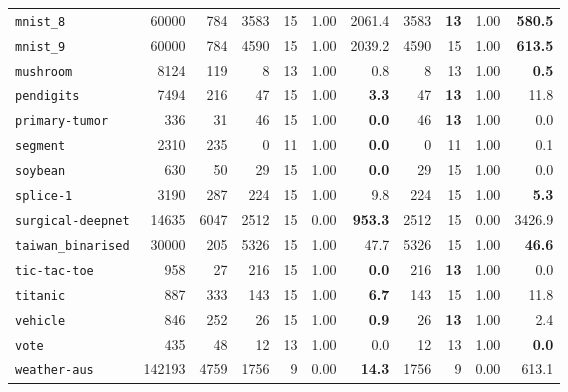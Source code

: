 \begin{tabular}{lccrrrrrrrr}
\texttt{mnist\_8} & \multicolumn{1}{r}{60000} & \multicolumn{1}{r}{784}  & 3583 & 15 & 1.00 & 2061.4 & 3583 & \textbf{13} & 1.00 & \textbf{580.5}\\
\texttt{mnist\_9} & \multicolumn{1}{r}{60000} & \multicolumn{1}{r}{784}  & 4590 & 15 & 1.00 & 2039.2 & 4590 & 15 & 1.00 & \textbf{613.5}\\
\texttt{mushroom} & \multicolumn{1}{r}{8124} & \multicolumn{1}{r}{119}  & 8 & 13 & 1.00 & 0.8 & 8 & 13 & 1.00 & \textbf{0.5}\\
\texttt{pendigits} & \multicolumn{1}{r}{7494} & \multicolumn{1}{r}{216}  & 47 & 15 & 1.00 & \textbf{3.3} & 47 & \textbf{13} & 1.00 & 11.8\\
\texttt{primary-tumor} & \multicolumn{1}{r}{336} & \multicolumn{1}{r}{31}  & 46 & 15 & 1.00 & \textbf{0.0} & 46 & \textbf{13} & 1.00 & 0.0\\
\texttt{segment} & \multicolumn{1}{r}{2310} & \multicolumn{1}{r}{235}  & 0 & 11 & 1.00 & \textbf{0.0} & 0 & 11 & 1.00 & 0.1\\
\texttt{soybean} & \multicolumn{1}{r}{630} & \multicolumn{1}{r}{50}  & 29 & 15 & 1.00 & \textbf{0.0} & 29 & 15 & 1.00 & 0.0\\
\texttt{splice-1} & \multicolumn{1}{r}{3190} & \multicolumn{1}{r}{287}  & 224 & 15 & 1.00 & 9.8 & 224 & 15 & 1.00 & \textbf{5.3}\\
\texttt{surgical-deepnet} & \multicolumn{1}{r}{14635} & \multicolumn{1}{r}{6047}  & 2512 & 15 & 0.00 & \textbf{953.3} & 2512 & 15 & 0.00 & 3426.9\\
\texttt{taiwan\_binarised} & \multicolumn{1}{r}{30000} & \multicolumn{1}{r}{205}  & 5326 & 15 & 1.00 & 47.7 & 5326 & 15 & 1.00 & \textbf{46.6}\\
\texttt{tic-tac-toe} & \multicolumn{1}{r}{958} & \multicolumn{1}{r}{27}  & 216 & 15 & 1.00 & \textbf{0.0} & 216 & \textbf{13} & 1.00 & 0.0\\
\texttt{titanic} & \multicolumn{1}{r}{887} & \multicolumn{1}{r}{333}  & 143 & 15 & 1.00 & \textbf{6.7} & 143 & 15 & 1.00 & 11.8\\
\texttt{vehicle} & \multicolumn{1}{r}{846} & \multicolumn{1}{r}{252}  & 26 & 15 & 1.00 & \textbf{0.9} & 26 & \textbf{13} & 1.00 & 2.4\\
\texttt{vote} & \multicolumn{1}{r}{435} & \multicolumn{1}{r}{48}  & 12 & 13 & 1.00 & 0.0 & 12 & 13 & 1.00 & \textbf{0.0}\\
\texttt{weather-aus} & \multicolumn{1}{r}{142193} & \multicolumn{1}{r}{4759}  & 1756 & 9 & 0.00 & \textbf{14.3} & 1756 & 9 & 0.00 & 613.1\\

\end{tabular}
